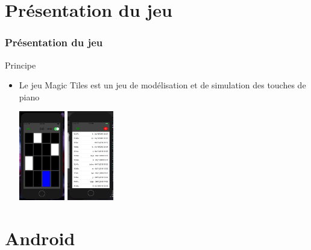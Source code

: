 \documentclass{beamer}
\begin{document}
\section{Présentation du jeu}

\begin{frame}
  \frametitle{Présentation du jeu}
\begin{block}{Principe} 
    \begin{itemize}
         \item {Le jeu Magic Tiles est un jeu de modélisation et de simulation des touches de piano}
     \begin{center}
      \includegraphics[width=20mm]{iOSapp1}
      \includegraphics[width=20mm]{iOS}

    \end{center}
    \end{itemize}
  \end{block}

\end{frame}

\section{Android}
\end{document}
